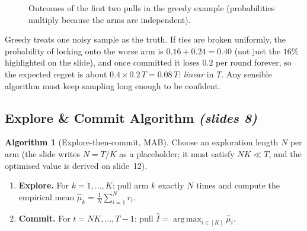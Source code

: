\documentclass[11pt,a4paper]{article}
\DeclareMathOperator*{\argmax}{arg\,max}
\newcommand{\slides}[1]{\emph{(slides #1)}}
\theoremstyle{plain}
\theoremstyle{definition}
\newtheorem{algorithm}[theorem]{Algorithm}
\theoremstyle{remark}
\begin{document}
\begin{figure}[ht]
\centering
{}
\caption{Outcomes of the first two pulls in the greedy example (probabilities multiply because the arms are independent).}
\end{figure}

\begin{intuition}
Greedy treats one noisy sample as the truth. If ties are broken uniformly, the probability of locking onto
the worse arm is $0.16+0.24=0.40$ (not just the $16\%$ highlighted on the slide), and once committed it loses
$0.2$ per round forever, so the expected regret is about $0.4\times0.2\,T=0.08\,T$: \emph{linear} in $T$.
Any sensible algorithm must keep sampling long enough to be confident.
\end{intuition}

\subsection{Explore \& Commit Algorithm \slides{8}}

\begin{algorithm}[Explore-then-commit, MAB]
Choose an exploration length $N$ per arm (the slide writes $N=T/K$ as a placeholder; it must satisfy $NK\ll T$, and
the optimised value is derived on slide~12).
\begin{enumerate}
  \item \textbf{Explore.} For $k=1,\dots,K$: pull arm $k$ exactly $N$ times and compute the empirical mean
        $\hat\mu_k=\frac1N\sum_{i=1}^N r_i$.
  \item \textbf{Commit.} For $t=NK,\dots,T-1$: pull $\hat I=\argmax_{i\in[K]}\hat\mu_i$.
\end{enumerate}
\end{algorithm}
\end{document}
